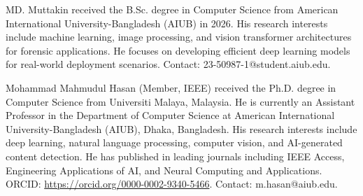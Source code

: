 \documentclass[journal]{IEEEtran}
\begin{document}
\begin{IEEEbiography}{MD. Muttakin}
received the B.Sc. degree in Computer Science from American International University-Bangladesh (AIUB) in 2026. His research interests include machine learning, image processing, and vision transformer architectures for forensic applications. He focuses on developing efficient deep learning models for real-world deployment scenarios. Contact: 23-50987-1@student.aiub.edu.
\end{IEEEbiography}

\begin{IEEEbiography}{Mohammad Mahmudul Hasan}
(Member, IEEE) received the Ph.D. degree in Computer Science from Universiti Malaya, Malaysia. He is currently an Assistant Professor in the Department of Computer Science at American International University-Bangladesh (AIUB), Dhaka, Bangladesh. His research interests include deep learning, natural language processing, computer vision, and AI-generated content detection. He has published in leading journals including IEEE Access, Engineering Applications of AI, and Neural Computing and Applications. ORCID: \url{https://orcid.org/0000-0002-9340-5466}. Contact: m.hasan@aiub.edu.
\end{IEEEbiography}
\end{document}
